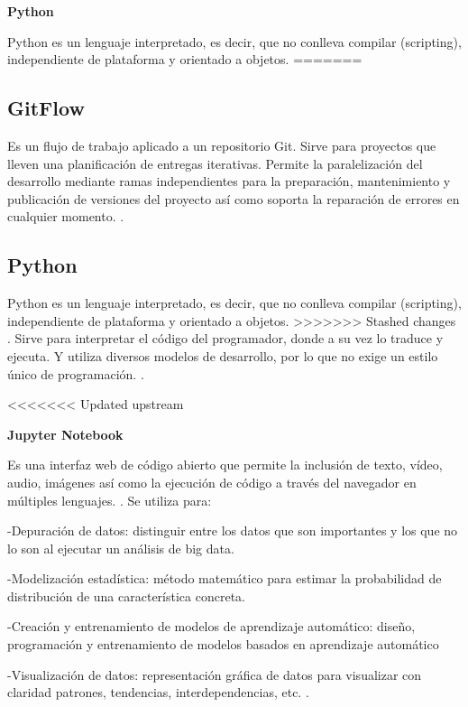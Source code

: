 \documentclass[12pt,letterpaper]{article}
\begin{document}
\item\textbf{Python}
\item Python es un lenguaje interpretado, es decir, que no conlleva compilar (scripting), independiente de plataforma y orientado a objetos. 
=======
\subsection*{GitFlow}
Es un flujo de trabajo aplicado a un repositorio Git. 
Sirve para proyectos que lleven una planificaci\'on de entregas iterativas. Permite la paralelización del desarrollo mediante ramas independientes para la preparaci\'on, mantenimiento y publicaci\'on de versiones del proyecto as\'i como soporta la reparaci\'on de errores en cualquier momento.
\cite[(Claventy. 2020)]{ref7}.

\subsection*{Python}
Python es un lenguaje interpretado, es decir, que no conlleva compilar (scripting), independiente de plataforma y orientado a objetos. 
>>>>>>> Stashed changes
\cite[(Desarrollo Web. 2003)]{ref8}.
Sirve para interpretar el c\'odigo del programador, donde a su vez lo traduce y ejecuta. Y utiliza diversos modelos de desarrollo, por lo que no exige un estilo \'unico de programaci\'on.
\cite[(Angeles, J. 2020)]{ref9}.


<<<<<<< Updated upstream
\item\textbf{Jupyter Notebook}
\item Es una interfaz web de c\'odigo abierto que permite la inclusi\'on de texto, v\'ideo, audio, im\'agenes as\'i como la ejecuci\'on de c\'odigo a trav\'es del navegador en m\'ultiples lenguajes. 
\cite[(Cabrera, E. y Diaz, E. s.f.)]{ref10}.
Se utiliza para: 
\item-Depuraci\'on de datos: distinguir entre los datos que son importantes y los que no lo son al ejecutar un an\'alisis de big data.
\item-Modelizaci\'on estad\'istica: m\'etodo matem\'atico para estimar la probabilidad de distribuci\'on de una caracter\'istica concreta.
\item-Creaci\'on y entrenamiento de modelos de aprendizaje autom\'atico: diseño, programaci\'on y entrenamiento de modelos basados en aprendizaje autom\'atico
\item-Visualizaci\'on de datos: representaci\'on gr\'afica de datos para visualizar con claridad patrones, tendencias, interdependencias, etc.
\cite[(Digital Guide IONOS. s.f.)]{ref11}.
\end{document}
